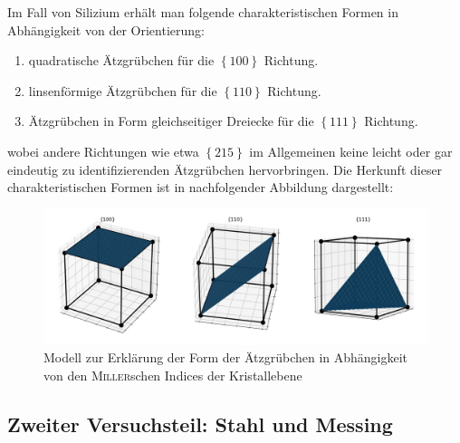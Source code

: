\documentclass[german,  %
parskip=full,  %
]{scrartcl}
\begin{document}
Im Fall von Silizium erhält man folgende charakteristischen Formen in Abhängigkeit von der Orientierung:
\begin{enumerate}
\item quadratische Ätzgrübchen für die \(\left\lbrace 100 \right\rbrace\) Richtung.
\item linsenförmige Ätzgrübchen für die \(\left\lbrace 110 \right\rbrace\) Richtung.
\item Ätzgrübchen in Form gleichseitiger Dreiecke für die \(\left\lbrace 111 \right\rbrace\) Richtung.
\end{enumerate}
wobei andere Richtungen wie etwa \(\left\lbrace 215 \right\rbrace\) im Allgemeinen keine leicht oder gar eindeutig zu identifizierenden Ätzgrübchen hervorbringen. Die Herkunft dieser charakteristischen Formen ist in nachfolgender Abbildung dargestellt:
\begin{figure}[h!]\centering
\includegraphics[width=\textwidth]{Aetzgruebchen_Modell.jpg}
\caption{Modell zur Erklärung der Form der Ätzgrübchen in Abhängigkeit von den \textsc{Miller}schen Indices der Kristallebene}
\end{figure}



\subsection{Zweiter Versuchsteil: Stahl und Messing}
\end{document}

